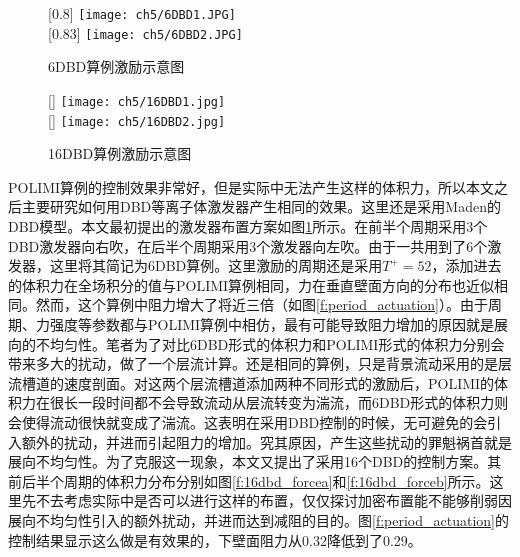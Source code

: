\begin{figure}[htb]
  \centering
  [0.8\textwidth]
  {\texttt{[image: ch5/6DBD1.JPG]}}
  \\\bigskip
  [0.83\textwidth]
  {\texttt{[image: ch5/6DBD2.JPG]}}
  \caption{6DBD算例激励示意图}\label{f:6dbd_force}
\end{figure}
\begin{figure}[htb]
  \centering
  [\textwidth]
  {\texttt{[image: ch5/16DBD1.jpg]}}
  \\\bigskip
  [\textwidth]
  {\texttt{[image: ch5/16DBD2.jpg]}}
  \caption{16DBD算例激励示意图}\label{f:16dbd_force}
\end{figure}
POLIMI算例的控制效果非常好，但是实际中无法产生这样的体积力，所以本文之后主要研究如何用DBD等离子体激发器产生相同的效果。这里还是采用Maden的\cite{Maden2013}DBD模型。本文最初提出的激发器布置方案如图\ref{f:6dbd_force}所示。在前半个周期采用3个DBD激发器向右吹，在后半个周期采用3个激发器向左吹。由于一共用到了6个激发器，这里将其简记为6DBD算例。这里激励的周期还是采用$T^+=52$，添加进去的体积力在全场积分的值与POLIMI算例相同，力在垂直壁面方向的分布也近似相同。然而，这个算例中阻力增大了将近三倍（如图\ref{f:period_actuation}）。由于周期、力强度等参数都与POLIMI算例中相仿，最有可能导致阻力增加的原因就是展向的不均匀性。笔者为了对比6DBD形式的体积力和POLIMI形式的体积力分别会带来多大的扰动，做了一个层流计算。还是相同的算例，只是背景流动采用的是层流槽道的速度剖面。对这两个层流槽道添加两种不同形式的激励后，POLIMI的体积力在很长一段时间都不会导致流动从层流转变为湍流，而6DBD形式的体积力则会使得流动很快就变成了湍流。这表明在采用DBD控制的时候，无可避免的会引入额外的扰动，并进而引起阻力的增加。究其原因，产生这些扰动的罪魁祸首就是展向不均匀性。为了克服这一现象，本文又提出了采用16个DBD的控制方案。其前后半个周期的体积力分布分别如图\ref{f:16dbd_forcea}和\ref{f:16dbd_forceb}所示。这里先不去考虑实际中是否可以进行这样的布置，仅仅探讨加密布置能不能够削弱因展向不均匀性引入的额外扰动，并进而达到减阻的目的。图\ref{f:period_actuation}的控制结果显示这么做是有效果的，下壁面阻力从0.32降低到了0.29。

